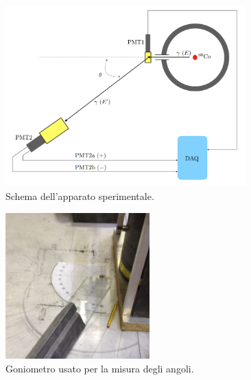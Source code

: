  \begin{figure}[h]
	\centering
	\includegraphics[width=25em]{schema_apparato}
	\caption{\label{fig:schema_apparato}Schema dell'apparato sperimentale.}
\end{figure}
 \begin{figure}[h]
	\centering
	\includegraphics[width=15em]{goniometro}
	\caption{\label{fig:goniometro}Goniometro usato per la misura degli angoli.}
\end{figure}

